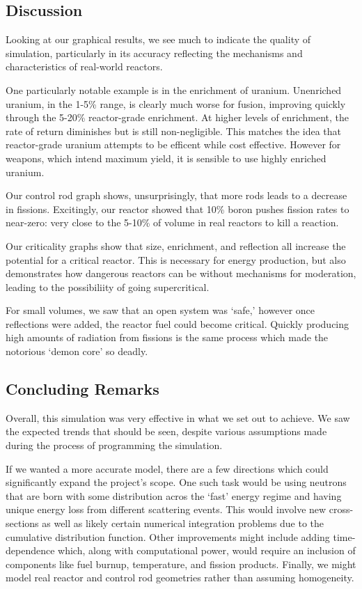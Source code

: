 \documentclass{notes}
\begin{document}
\subsection*{Discussion}

Looking at our graphical results, we see much to indicate the quality of simulation, particularly in its accuracy reflecting the mechanisms and characteristics of real-world reactors. 

One particularly notable example is in the enrichment of uranium. Unenriched uranium, in the 1-5\% range, is clearly much worse for fusion, improving quickly through the 5-20\% reactor-grade enrichment. At higher levels of enrichment, the rate of return diminishes but is still non-negligible. This matches the idea that reactor-grade uranium attempts to be efficent while cost effective. However for weapons, which intend maximum yield, it is sensible to use highly enriched uranium.

Our control rod graph shows, unsurprisingly, that more rods leads to a decrease in fissions. Excitingly, our reactor showed that 10\% boron pushes fission rates to near-zero: very close to the 5-10\% of volume in real reactors to kill a reaction.

Our criticality graphs show that size, enrichment, and reflection all increase the potential for a critical reactor. This is necessary for energy production, but also demonstrates how dangerous reactors can be without mechanisms for moderation, leading to the possibiliity of going supercritical.

For small volumes, we saw that an open system was `safe,' however once reflections were added, the reactor fuel could become critical. Quickly producing high amounts of radiation from fissions is the same process which made the notorious `demon core' so deadly.

\subsection*{Concluding Remarks}

Overall, this simulation was very effective in what we set out to achieve. We saw the expected trends that should be seen, despite various assumptions made during the process of programming the simulation.

If we wanted a more accurate model, there are a few directions which could significantly expand the project's scope. One such task would be using neutrons that are born with some distribution acros the `fast' energy regime and having unique energy loss from different scattering events. This would involve new cross-sections as well as likely certain numerical integration problems due to the cumulative distribution function. Other improvements might include adding time-dependence which, along with computational power, would require an inclusion of components like fuel burnup, temperature, and fission products. Finally, we might model real reactor and control rod geometries rather than assuming homogeneity.
\end{document}
